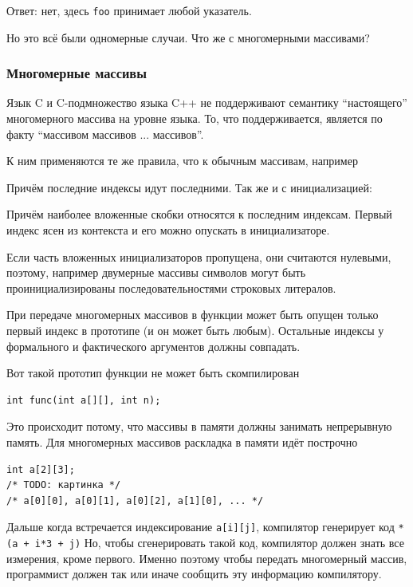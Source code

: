 \documentclass[a4paper,12pt,oneside]{article}
\begin{document}
Ответ: нет, здесь \lstinline!foo! принимает любой указатель.

Но это всё были одномерные случаи. Что же с многомерными массивами?

\subsubsection{Многомерные массивы}\label{MultiDimArr}

Язык C и C-подмножество языка C++ не поддерживают семантику ``настоящего'' многомерного массива на уровне языка.  То, что поддерживается, является по факту ``массивом массивов ... массивов''. 

К ним применяются те же правила, что к обычным массивам, например



Причём последние индексы идут последними. Так же и с инициализацией:



Причём наиболее вложенные скобки относятся к последним индексам. Первый индекс ясен из контекста и его можно опускать в инициализаторе.

Если часть вложенных инициализаторов пропущена, они считаются нулевыми, поэтому, например двумерные массивы символов могут быть проинициализированы последовательностями строковых литералов.

При передаче многомерных массивов в функции может быть опущен только первый индекс в прототипе (и он может быть любым). Остальные индексы у формального и фактического аргументов должны совпадать.

Вот такой прототип функции не может быть скомпилирован

\begin{lstlisting}
int func(int a[][], int n);
\end{lstlisting}

Это происходит потому, что массивы в памяти должны занимать непрерывную память. Для многомерных массивов раскладка в памяти идёт построчно

\begin{lstlisting}
int a[2][3];
/* TODO: картинка */
/* a[0][0], a[0][1], a[0][2], a[1][0], ... */
\end{lstlisting}

Дальше когда встречается индексирование \lstinline!a[i][j]!, компилятор генерирует код \lstinline!*(a + i*3 + j)!
Но, чтобы сгенерировать такой код, компилятор должен знать все измерения, кроме первого. Именно поэтому чтобы передать многомерный массив, программист должен так или иначе сообщить эту информацию компилятору.
\end{document}
